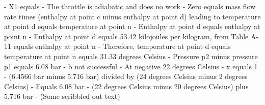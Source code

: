 - X1 equals
- The throttle is adiabatic and does no work
- Zero equals mass flow rate times (enthalpy at point c minus enthalpy at point d) leading to temperature at point d equals temperature at point n
- Enthalpy at point d equals enthalpy at point n
- Enthalpy at point d equals 53.42 kilojoules per kilogram, from Table A-11 equals enthalpy at point n
- Therefore, temperature at point d equals temperature at point n equals 31.33 degrees Celsius
- Pressure p2 minus pressure p1 equals 6.08 bar
- b not successful
- At negative 22 degrees Celsius
- x equals 1
- (6.4566 bar minus 5.716 bar) divided by (24 degrees Celsius minus 2 degrees Celsius)
- Equals 6.08 bar
- (22 degrees Celsius minus 20 degrees Celsius) plus 5.716 bar
- (Some scribbled out text)
